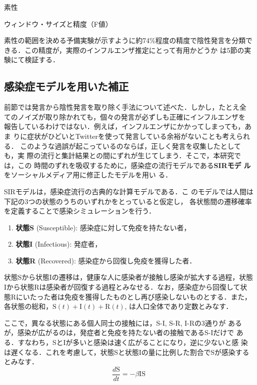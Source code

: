 \documentclass[japanese]{jnlp_1.4}
\begin{document}
\begin{table}[t]
\caption{素性}
\label{t_素性}

\end{table}
\begin{table}[t]
\caption{ウィンドウ・サイズと精度（F値）}
\label{f_win_size.eps}

\end{table}

素性の範囲を決める予備実験が示すように約74\%程度の精度で陰性発言を分類で
きる．この精度が，実際のインフルエンザ推定にとって有用かどうか
は5節の実験にて検証する．



\subsection{感染症モデルを用いた補正}

前節では発言から陰性発言を取り除く手法について述べた．しかし，たとえ全
てのノイズが取り除かれても，個々の発言が必ずしも正確にインフルエンザを
報告しているわけではない．例えば，インフルエンザにかかってしまっても，あま
りに症状がひどいとTwitterを使って発言している余裕がないことも考えられる．
このような過誤が起こっているのならば，正しく発言を収集したとしても，実
際の流行と集計結果との間にずれが生じてしまう．そこで，本研究では，この
時間のずれを吸収するために，感染症の流行モデルである{\bf SIRモデ
  ル} \cite{Kermack1927}をソーシャルメディア用に修正したモデルを用い
る．


SIRモデル\cite{Kermack1927}は，感染症流行の古典的な計算モデルである．こ
のモデルでは人間は下記の3つの状態のうちのいずれかをとっていると仮定し，
各状態間の遷移確率を定義することで感染シミュレーションを行う．

\begin{enumerate}
\item {\bf 状態S} (Susceptible): 感染症に対して免疫を持たない者，
\item {\bf 状態I} (Infectious): 発症者，
\item {\bf 状態R} (Recovered): 感染症から回復し免疫を獲得した者．
\end{enumerate}

状態Sから状態Iの遷移は，健康な人に感染者が接触し感染が拡大する過程，状態Iから状態Rは感染者が回復する過程とみなせる．なお，感染症から回復して状態Rにいたった者は免疫を獲得したものとし再び感染しないものとする．また，各状態の総和，$\mathrm{S}(t)+\mathrm{I}(t)+\mathrm{R}(t)$, は人口全体であり定数とみなす．

ここで，異なる状態にある個人同士の接触には，S-I, S-R, I-Rの3通りが
あるが，感染が広がるのは，発症者と免疫を持たない者の接触であるS-Iだけで
ある．すなわち，SとIが多いと感染は速く広がることになり，逆に少ないと感
染は遅くなる．これを考慮して，状態Sと状態Iの量に比例した割合でSが感染するとみなす．
\begin{equation}
\frac{d\mathrm{S}}{dt}=- \beta \mathrm{IS} 
\end{equation}
\end{document}
